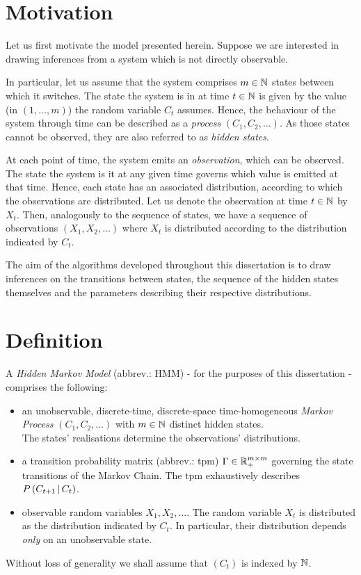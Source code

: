 \section{Motivation}

Let us first motivate the model presented herein. Suppose we are interested in drawing inferences from a system which is not directly observable. 

In particular, let us assume that the system comprises $m \in \mathbb{N}$ states between which it switches. The state the system is in at time $t \in \mathbb{N}$ is given by the value (in $\left(1, \dots, m\right)$) the random variable $C_t$ assumes. Hence, the behaviour of the system through time can be described as a \textit{process} $\left(C_1, C_2, \dots \right)$. As those states cannot be observed, they are also referred to as \textit{hidden states}. 

At each point of time, the system emits an \textit{observation}, which can be observed. The state the system is it at any given time governs which value is emitted at that time. Hence, each state has an associated distribution, according to which the observations are distributed. Let us denote the observation at time $t \in \mathbb{N}$ by $X_t$. Then, analogously to the sequence of states, we have a sequence of observations $\left(X_1, X_2, \dots \right)$ where $X_t$ is distributed according to the distribution indicated by $C_t$. 

The aim of the algorithms developed throughout this dissertation is to draw inferences on the transitions between states, the sequence of the hidden states themselves  and the parameters describing their respective distributions. 






\section{Definition}


A \textit{Hidden Markov Model} (abbrev.: HMM) - for the purposes of this dissertation - comprises the following: 
\begin{itemize}
\item an unobservable, discrete-time, discrete-space time-homogeneous \textit{Markov Process} 
$\left(C_1, C_2, \dots \right)$ with $m \in \mathbb{N}$ distinct hidden states.\\
The states' realisations determine the observations' distributions. 

\item a transition probability matrix (abbrev.: tpm) $\Gamma \in \mathbb{R}_+^{m \times m}$ governing the state transitions of the Markov Chain. The tpm exhaustively describes $P\left(C_{t+1} \, | \, C_t\right)$.  

\item observable random variables $X_1, X_2, \dots$. The random variable $X_t$ is distributed as the distribution indicated by $C_t$. In particular, their distribution depends \textit{only} on an unobservable state. 
\end{itemize}
Without loss of generality we shall assume that $(C_t)$ is indexed by $\mathbb{N}$. 


